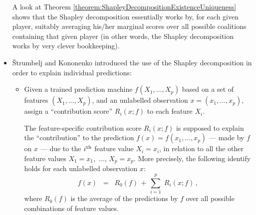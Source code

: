 \begin{itemize}
	A look at Theorem \ref{theorem:ShapleyDecompositionExistenceUniqueness} shows
	that the Shapley decomposition essentially works by,
	for each given player, {\color{red}suitably averaging} his/her {\color{red}marginal scores}
	over all possible coalitions containing that given player
	(in other words, the Shapley decomposition works by very clever bookkeeping).

\item
	\v{S}trumbelj and Kononenko \cite{Strumbelj2010}
	introduced the use of the Shapley decomposition
	in order to {\color{red}explain individual predictions}:
	\begin{itemize}
	\item
		Given a trained prediction machine $f(X_{1},\ldots,X_{p})$
		based on a set of features $(X_{1},\ldots,X_{p})$, and
		an unlabelled observation $x = (x_{1},\ldots,x_{p})$,
		assign a ``contribution score'' $R_{i}(x;f)$ to each feature $X_{i}$.
		
		The feature-specific contribution score $R_{i}(x;f)$ is supposed to
		explain the ``{\color{red}contribution}'' to the prediction
		$f(x) = f(x_{1},\ldots,x_{p})$ --- made by $f$ on $x$ ---
		due to the $i^{\textnormal{th}}$ feature value $X_{i} = x_{i}$,
		in relation to all the other feature values
		$X_{1} = x_{1}$, \,$\ldots$\;, $X_{p} = x_{p}$.
		More precisely, the following identify holds for each unlabelled observation $x$:
		\begin{equation*}
		f(x)
		\;\; = \;\;
			R_{0}(f)
			\, + \,
			\overset{p}{\underset{i=1}{\sum}}\;
			R_{i}(x;f)\,,
		\end{equation*}
		where $R_{0}(f)$ is the average of the predictions by $f$
		over all possible combinations of feature values.


\end{itemize}
\end{itemize}
